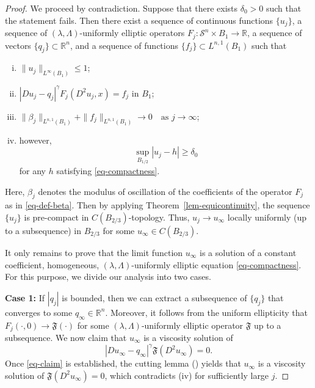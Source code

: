 \documentclass[11pt]{amsart}
\theoremstyle{plain}
\theoremstyle{definition}
\numberwithin{equation}{section}
\begin{document}
\begin{proof}
    We proceed by contradiction. Suppose that there exists $\delta_0>0$ such that the statement fails.
    Then there exist a sequence of continuous functions $\{u_j\}$, a sequence of $(\lambda, \Lambda)$-uniformly elliptic operators $F_j : \mathcal{S}^n \times B_1 \to \mathbb{R}$, a sequence of vectors $\{q_j\} \subset \mathbb{R}^n$, and a sequence of functions $\{f_j\} \subset L^{n,1}(B_1)$ such that
    \begin{enumerate}[(i)]
        \item $\|u_j\|_{L^{\infty}(B_1)} \leq 1$;
        \item $|Du_j-q_j|^{\gamma}F_j(D^2u_j, x) =f_j$ in $B_1$;
        \item $\|\beta_j\|_{L^{n,1}(B_1)} +\|f_j\|_{L^{n,1}(B_1)}  \to 0 \quad \text{as $j \to \infty$}$;
    \item however,
    \begin{equation*}
        \sup_{B_{1/2}}|u_j-h| \geq \delta_0
    \end{equation*}
    for any $h$ satisfying \eqref{eq-compactness}.
    \end{enumerate}
    Here, $\beta_j$ denotes the modulus of oscillation of the coefficients of the operator $F_j$ as in \eqref{eq-def-beta}.
    Then by applying Theorem~\ref{lem-equicontinuity}, the sequence $\{u_j\}$ is pre-compact in $C(B_{2/3})$-topology.
    Thus, $u_j \to u_{\infty}$ locally uniformly (up to a subsequence) in $B_{2/3}$ for some $u_\infty \in C(B_{2/3})$. 

    It only remains to prove that the limit function $u_{\infty}$ is a solution of a constant coefficient, homogeneous, $(\lambda, \Lambda)$-uniformly elliptic equation \eqref{eq-compactness}. For this purpose, we divide our analysis into two cases.

    \textbf{Case 1:} If $|q_j|$ is bounded, then we can extract a subsequence of $\{q_j\}$ that converges to some $q_{\infty} \in \mathbb{R}^n$. Moreover, it follows from the uniform ellipticity that $F_j(\cdot, 0) \to \mathfrak{F}(\cdot)$ for some $(\lambda, \Lambda)$-uniformly elliptic operator $\mathfrak{F}$ up to a subsequence. We now claim that $u_{\infty}$ is a viscosity solution of    
    \begin{equation}\label{eq-claim}
        |Du_{\infty}-q_{\infty}|^{\gamma}\mathfrak{F}(D^2u_{\infty})=0.
    \end{equation}
    Once \eqref{eq-claim} is established, the cutting lemma (\cite[Lemma~6]{IS13}) yields that $u_{\infty}$ is a viscosity solution of $\mathfrak{F}(D^2u_{\infty})=0$, which contradicts (iv) for sufficiently large $j$.


\end{proof}
\end{document}
